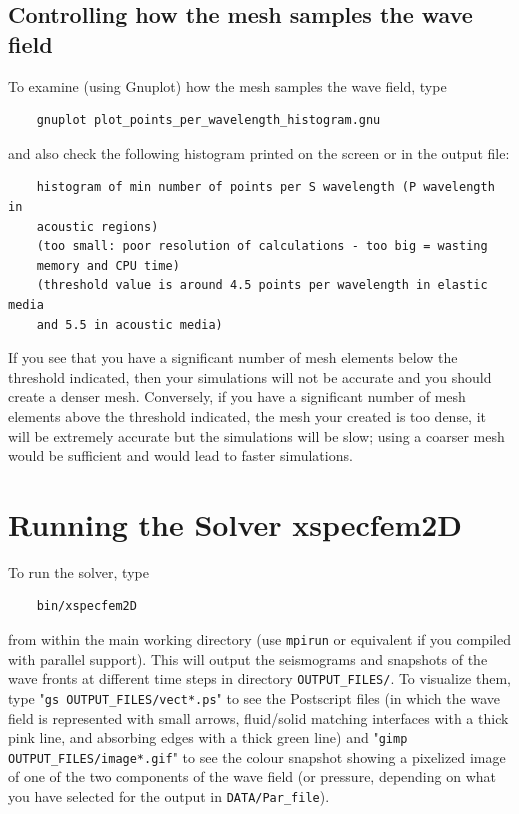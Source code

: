 \documentclass[oneside,english,onecolumn,letterpaper]{book}
\begin{document}
\section{Controlling how the mesh samples the wave field}

To examine (using Gnuplot) how the mesh samples the wave field, type
%
\begin{verbatim}
    gnuplot plot_points_per_wavelength_histogram.gnu
\end{verbatim}
%
and also check the following histogram printed on the screen or in the output file:
%
\begin{verbatim}
    histogram of min number of points per S wavelength (P wavelength in
    acoustic regions)
    (too small: poor resolution of calculations - too big = wasting
    memory and CPU time)
    (threshold value is around 4.5 points per wavelength in elastic media
    and 5.5 in acoustic media)
\end{verbatim}

If you see that you have a significant number of mesh elements below the threshold indicated, then your simulations
will not be accurate and you should create a denser mesh. Conversely, if you have a significant number of mesh elements above the threshold indicated,
the mesh your created is too dense, it will be extremely accurate but the simulations will be slow; using a coarser mesh would be sufficient and would lead to faster simulations.


\chapter{Running the Solver xspecfem2D}


To run the solver, type
%
\begin{verbatim}
    bin/xspecfem2D
\end{verbatim}
%
from within the main working directory (use \texttt{mpirun} or equivalent if you compiled with parallel support). This will output the seismograms and snapshots of the wave fronts at different time steps in directory \texttt{OUTPUT\_FILES/}. To visualize them, type "\texttt{gs OUTPUT\_FILES/vect*.ps}" to see the Postscript files (in which the wave field is represented with small arrows, fluid/solid matching interfaces with a thick pink line, and absorbing edges with a thick green line) and "\texttt{gimp OUTPUT\_FILES/image*.gif}" to see the colour snapshot showing a pixelized image of one of the two components of the wave field (or pressure, depending on what you have selected for the output in \texttt{DATA/Par\_file}).
\end{document}
